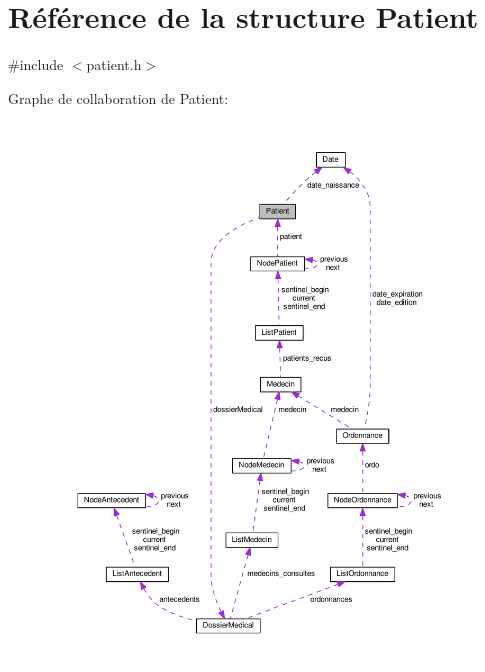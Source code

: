 \hypertarget{struct_patient}{\section{Référence de la structure Patient}
\label{struct_patient}
}


{\ttfamily \#include $<$patient.\-h$>$}



Graphe de collaboration de Patient\-:
\nopagebreak
\begin{figure}[H]
\begin{center}
\leavevmode
\includegraphics[width=350pt]{struct_patient__coll__graph}
\end{center}
\end{figure}
